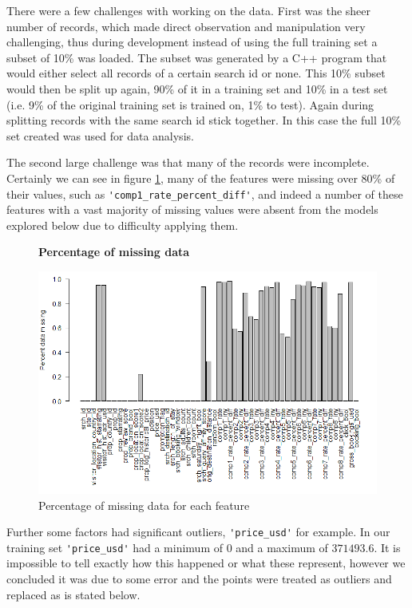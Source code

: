 \documentclass{llncs}
\begin{document}
	There were a few challenges with working on the data. First was the sheer number of records, which made direct observation and manipulation very challenging, thus during development instead of using the full training set a subset of 10\% was loaded. The subset was generated by a C++ program that would either select all records of a certain search id or none. This 10\% subset would then be split up again, 90\% of it in a training set and 10\% in a test set (i.e. 9\% of the original training set is trained on, 1\% to test). Again during splitting records with the same search id stick together. In this case the full 10\% set created was used for data analysis.

	The second large challenge was that many of the records were incomplete. Certainly we can see in figure \ref{fig:pctM}, many of the features were missing over 80\% of their values, such as \verb!'comp1_rate_percent_diff'!, and indeed a number of these features with a vast majority of missing values were absent from the models explored below due to difficulty applying them.
	
	\begin{figure}[H]
	\centering
	\textbf{Percentage of missing data}\par\medskip
		\includegraphics[scale=0.4]{figures/pct_missing.png}
	\caption{Percentage of missing data for each feature}
	\label{fig:pctM}
	\end{figure}
	
	Further some factors had significant outliers, \verb!'price_usd'! for example. In our training set \verb!'price_usd'! had a minimum of $0$ and a maximum of $371493.6$. It is impossible to tell exactly how this happened or what these represent, however we concluded it was due to some error and the points were treated as outliers and replaced as is stated below. 
	
\end{document}
